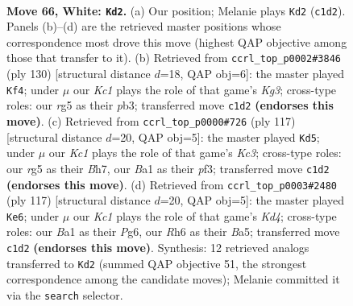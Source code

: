 \documentclass[11pt]{article}
\begin{document}
\clearpage

\begin{figure}[p]\centering
\begin{subfigure}{0.46\textwidth}\centering
\resizebox{\linewidth}{!}{%
\newchessgame
\chessboard[
  setfen={3k4/8/7R/pp4r1/b1p5/P1P5/8/B1K5 w - - 38 66},
  showmover=false,
  pgfstyle=straightmove, color=movearrow, markmove={c1-d2}
]}
\caption{}
\end{subfigure}\hfill
\begin{subfigure}{0.46\textwidth}\centering
\resizebox{\linewidth}{!}{%
\newchessgame
\chessboard[
  setfen={8/2k2p1p/4b1pP/6P1/R7/1p4K1/8/8 w - - 2 66},
  showmover=false,
  pgfstyle=straightmove, color=movearrow, markmove={g3-f4}
]}
\caption{}
\end{subfigure}
\\[4pt]
\begin{subfigure}{0.46\textwidth}\centering
\resizebox{\linewidth}{!}{%
\newchessgame
\chessboard[
  setfen={8/7b/2k5/1p6/p2B4/P1P2P2/1P2K3/8 b - - 32 59},
  showmover=false,
  pgfstyle=straightmove, color=movearrow, markmove={c6-d5}
]}
\caption{}
\end{subfigure}\hfill
\begin{subfigure}{0.46\textwidth}\centering
\resizebox{\linewidth}{!}{%
\newchessgame
\chessboard[
  setfen={8/8/6p1/b2k1p1p/7B/4PPP1/7P/2K5 b - - 49 59},
  showmover=false,
  pgfstyle=straightmove, color=movearrow, markmove={d5-e6}
]}
\caption{}
\end{subfigure}
\caption{\textbf{Move 66, White: \texttt{Kd2}.} (a) Our position; Melanie plays \texttt{Kd2} (\texttt{c1d2}). Panels (b)--(d) are the retrieved master positions whose correspondence most drove this move (highest QAP objective among those that transfer to it). (b) Retrieved from \texttt{ccrl\_top\_p0002\#3846} (ply 130) [structural distance $d$=18, QAP obj=6]: the master played \texttt{Kf4}; under $\mu$ our \emph{Kc1} plays the role of that game's \emph{Kg3}; cross-type roles: our \emph{r}g5 as their \emph{p}b3; transferred move \texttt{c1d2} \textbf{(endorses this move)}. (c) Retrieved from \texttt{ccrl\_top\_p0000\#726} (ply 117) [structural distance $d$=20, QAP obj=5]: the master played \texttt{Kd5}; under $\mu$ our \emph{Kc1} plays the role of that game's \emph{Kc3}; cross-type roles: our \emph{r}g5 as their \emph{B}h7, our \emph{B}a1 as their \emph{p}f3; transferred move \texttt{c1d2} \textbf{(endorses this move)}. (d) Retrieved from \texttt{ccrl\_top\_p0003\#2480} (ply 117) [structural distance $d$=20, QAP obj=5]: the master played \texttt{Ke6}; under $\mu$ our \emph{Kc1} plays the role of that game's \emph{Kd4}; cross-type roles: our \emph{B}a1 as their \emph{P}g6, our \emph{R}h6 as their \emph{B}a5; transferred move \texttt{c1d2} \textbf{(endorses this move)}. Synthesis: 12 retrieved analogs transferred to \texttt{Kd2} (summed QAP objective 51, the strongest correspondence among the candidate moves); Melanie committed it via the \texttt{search} selector.}
\label{fig:thought-m130}
\end{figure}
\end{document}
